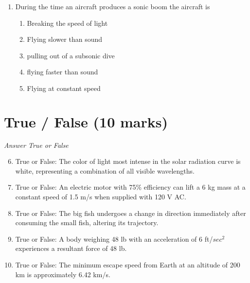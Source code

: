 \documentclass[12pt]{article}
\begin{document}
\begin{enumerate}[label=\arabic*.]
\begin{enumerate}[label=(\alph*)]
    \item Both of the above
    \item +3 e and -4 e
    \item +5 e and -6 e
    \item +2.5 e and -3.5 e
    \item +4 e and -5 e
\end{enumerate}
\item During the time an aircraft produces a sonic boom the aircraft is
\begin{enumerate}[label=(\alph*)]
    \item Breaking the speed of light
    \item Flying slower than sound
    \item pulling out of a subsonic dive
    \item flying faster than sound
    \item Flying at constant speed
\end{enumerate}
\end{enumerate}

\section*{True / False (10 marks)}
\textit{Answer True or False}
\begin{enumerate}[label=\arabic*.]
\setcounter{enumi}{5}
\item True or False: The color of light most intense in the solar radiation curve is white, representing a combination of all visible wavelengths.
\item True or False: An electric motor with 75\% efficiency can lift a 6 kg mass at a constant speed of 1.5 m/s when supplied with 120 V AC.
\item True or False: The big fish undergoes a change in direction immediately after consuming the small fish, altering its trajectory.
\item True or False: A body weighing 48 lb with an acceleration of 6 ft/$sec^2$ experiences a resultant force of 48 lb.
\item True or False: The minimum escape speed from Earth at an altitude of 200 km is approximately 6.42 km/s.
\end{enumerate}
\end{document}
